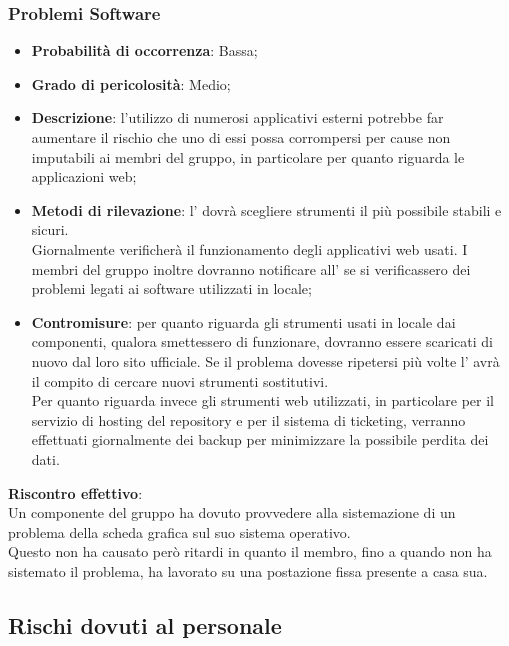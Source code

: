 		\subsubsection{Problemi Software} %
		\label{ssub:problemi_software}
			\begin{itemize}
				\item \textbf{Probabilità di occorrenza}: Bassa;
				\item \textbf{Grado di pericolosità}: Medio;
				\item \textbf{Descrizione}: l'utilizzo di numerosi applicativi esterni potrebbe far aumentare il rischio che uno di essi possa corrompersi per cause non imputabili ai membri del gruppo, in particolare per quanto riguarda le applicazioni web;
				\item \textbf{Metodi di rilevazione}: l'\roleAdministrator{} dovrà scegliere strumenti il più possibile stabili e sicuri. \\
				Giornalmente verificherà il funzionamento degli applicativi web usati. I membri del gruppo inoltre dovranno notificare all'\roleAdministrator{} se si verificassero dei problemi legati ai software utilizzati in locale;
				\item \textbf{Contromisure}: per quanto riguarda gli strumenti usati in locale dai componenti, qualora smettessero di funzionare, dovranno essere scaricati di nuovo dal loro sito ufficiale. Se il problema dovesse ripetersi più volte l'\roleAdministrator{} avrà il compito di cercare nuovi strumenti sostitutivi. \\
				Per quanto riguarda invece gli strumenti web utilizzati, in particolare per il servizio di hosting del repository\gloss{} e per il sistema di ticketing\gloss{}, verranno effettuati giornalmente dei backup per minimizzare la possibile perdita dei dati.
			\end{itemize}
		\noindent
		\textbf{Riscontro effettivo}: \\
		Un componente del gruppo ha dovuto provvedere alla sistemazione di un problema della scheda grafica sul suo sistema operativo. \\
		Questo non ha causato però ritardi in quanto il membro, fino a quando non ha sistemato il problema, ha lavorato su una postazione fissa presente a casa sua.
		
	
	\subsection{Rischi dovuti al personale} %
	\label{sub:rischi_dovuti_al_personale}
